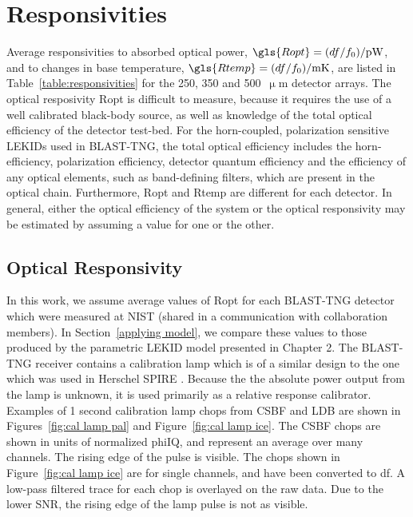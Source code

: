 \section{Responsivities}\label{responsivities}

Average responsivities to absorbed optical power, $\gls{Ropt} = (df/f_{0})/\mathrm{pW}$, and to changes in base temperature, $\gls{Rtemp} = (df/f_{0})/\mathrm{mK}$, are listed in Table~\ref{table:responsivities} for the 250, 350 and 500~$\upmu$m detector arrays. The optical resposivity \gls{Ropt} is difficult to measure, because it requires the use of a well calibrated black-body source, as well as knowledge of the total optical efficiency of the detector test-bed. For the horn-coupled, polarization sensitive LEKIDs used in BLAST-TNG, the total optical efficiency includes the horn-efficiency, polarization efficiency, detector quantum efficiency and the efficiency of any optical elements, such as band-defining filters, which are present in the optical chain. Furthermore, \gls{Ropt} and \gls{Rtemp} are different for each detector. In general, either the optical efficiency of the system or the optical responsivity may be estimated by assuming a value for one or the other.

\subsection{Optical Responsivity}

In this work, we assume average values of \gls{Ropt} for each BLAST-TNG detector which were measured at NIST (shared in a communication with collaboration members). In Section~\ref{applying model}, we compare these values to those produced by the parametric LEKID model presented in Chapter 2. The BLAST-TNG receiver contains a calibration lamp which is of a similar design to the one which was used in Herschel SPIRE \citep{hargrave2006performance}. Because the the absolute power output from the lamp is unknown, it is used primarily as a relative response calibrator. Examples of 1 second calibration lamp chops from CSBF and LDB are shown in Figures~\ref{fig:cal lamp pal} and Figure~\ref{fig:cal lamp ice}. The CSBF chops are shown in units of normalized \gls{phiIQ}, and represent an average over many channels. The rising edge of the pulse is visible. The chops shown in Figure~\ref{fig:cal lamp ice} are for single channels, and have been converted to \gls{df}. A low-pass filtered trace for each chop is overlayed on the raw data. Due to the lower SNR, the rising edge of the lamp pulse is not as visible.

